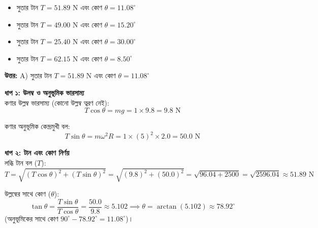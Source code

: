\documentclass[12pt, a4paper]{article}
\begin{document}
\begin{itemize}[label={}, leftmargin=1cm, itemsep=0.5em]
    \item[\textbf{A)}] সুতার টান $T = 51.89\text{ N}$ এবং কোণ $\theta = 11.08^\circ$
    \item[\textbf{B)}] সুতার টান $T = 49.00\text{ N}$ এবং কোণ $\theta = 15.20^\circ$
    \item[\textbf{C)}] সুতার টান $T = 25.40\text{ N}$ এবং কোণ $\theta = 30.00^\circ$
    \item[\textbf{D)}] সুতার টান $T = 62.15\text{ N}$ এবং কোণ $\theta = 8.50^\circ$
\end{itemize}

\vspace{0.5em}
\begin{tcolorbox}[answerbox]
    \textbf{\color{success} উত্তর:} A) সুতার টান $T = 51.89\text{ N}$ এবং কোণ $\theta = 11.08^\circ$
\end{tcolorbox}
\vspace{1em}

\begin{tcolorbox}[solutionbox={সমাধান (Solution)}]
    \noindent
    \textbf{ধাপ ১: উলম্ব ও অনুভূমিক ভারসাম্য} \\
    কণার উল্লম্ব ভারসাম্য (কোনো উল্লম্ব ত্বরণ নেই):
    \[ T \cos\theta = m g = 1 \times 9.8 = 9.8\text{ N} \]
    
    কণার অনুভূমিক কেন্দ্রমুখী বল:
    \[ T \sin\theta = m \omega^2 R = 1 \times (5)^2 \times 2.0 = 50.0\text{ N} \]
    
    \vspace{0.5em}
    \noindent\textbf{ধাপ ২: টান এবং কোণ নির্ণয়} \\
    লব্ধি টান বল ($T$):
    \[ T = \sqrt{(T \cos\theta)^2 + (T \sin\theta)^2} = \sqrt{(9.8)^2 + (50.0)^2} = \sqrt{96.04 + 2500} = \sqrt{2596.04} \approx \mathbf{51.89}\text{ N} \]
    
    উল্লম্বের সাথে কোণ ($\theta$):
    \[ \tan\theta = \frac{T \sin\theta}{T \cos\theta} = \frac{50.0}{9.8} \approx 5.102 \implies \theta = \arctan(5.102) \approx 78.92^\circ \]
    (অনুভূমিকের সাথে কোণ $90^\circ - 78.92^\circ = \mathbf{11.08^\circ}$)।
\end{tcolorbox}

\newpage
\end{document}
